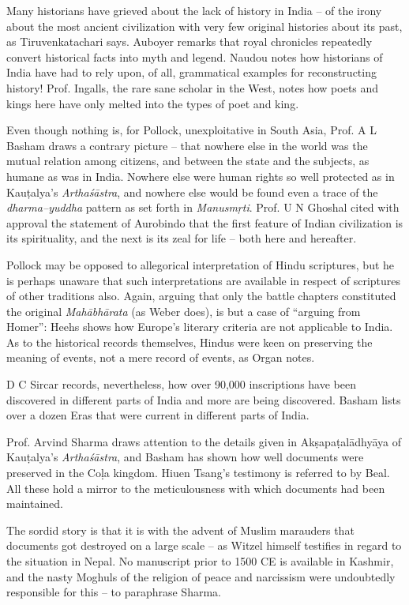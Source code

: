 Many historians have grieved about the lack of history in India – of the irony about the most ancient civilization with very few original histories about its past, as Tiruvenkatachari says. Auboyer remarks that royal chronicles repeatedly convert historical facts into myth and legend. Naudou notes how historians of India have had to rely upon, of all, grammatical examples for reconstructing history! Prof. Ingalls, the rare sane scholar in the West, notes how poets and kings here have only melted into the types of poet and king.

Even though nothing is, for Pollock, unexploitative in South Asia, Prof. A L Basham draws a contrary picture – that nowhere else in the world was the mutual relation among citizens, and between the state and the subjects, as humane as was in India. Nowhere else were human rights so well protected as in Kauṭalya’s \textit{Arthaśāstra}, and nowhere else would be found even a trace of the \textit{dharma–yuddha} pattern as set forth in \textit{Manusmṛti}. Prof. U N Ghoshal cited with approval the statement of Aurobindo that the first feature of Indian civilization is its spirituality, and the next is its zeal for life – both here and hereafter.

Pollock may be opposed to allegorical interpretation of Hindu scriptures, but he is perhaps unaware that such interpretations are available in respect of scriptures of other traditions also. Again, arguing that only the battle chapters constituted the original \textit{Mahābhārata} (as Weber does), is but a case of “arguing from Homer”: Heehs shows how Europe’s literary criteria are not applicable to India. As to the historical records themselves, Hindus were keen on preserving the meaning of events, not a mere record of events, as Organ notes.

D C Sircar records, nevertheless, how over 90,000 inscriptions have been discovered in different parts of India and more are being discovered. Basham lists over a dozen Eras that were current in different parts of India.

Prof. Arvind Sharma draws attention to the details given in Akṣapaṭalādhyāya of Kauṭalya’s \textit{Arthaśāstra}, and Basham has shown how well documents were preserved in the Coḷa kingdom. Hiuen Tsang’s testimony is referred to by Beal. All these hold a mirror to the meticulousness with which documents had been maintained. 

The sordid story is that it is with the advent of Muslim marauders that documents got destroyed on a large scale – as Witzel himself testifies in regard to the situation in Nepal. No manuscript prior to 1500 CE is available in Kashmir, and the nasty Moghuls of the religion of peace and narcissism were undoubtedly responsible for this – to paraphrase Sharma.

